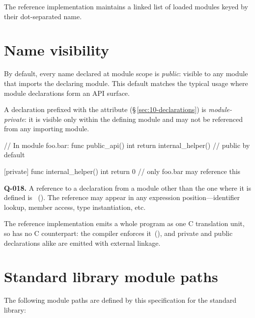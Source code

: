 \begin{note}
  The reference implementation maintains a linked list of loaded modules
  keyed by their dot-separated name.
\end{note}

\section{Name visibility}
\label{sec:mod.visibility}

\pnum
By default, every name declared at module scope is \textit{public}:
visible to any module that imports the declaring module.  This default
matches the typical usage where module declarations form an API surface.

\pnum
A declaration prefixed with the attribute \tok{[private]}
(\S\,\ref{sec:10-declarations}) is \textit{module-private}: it is
visible only within the defining module and may not be referenced from
any importing module.

\begin{laincode}
// In module foo.bar:
func public_api() int { return internal_helper() }   // public by default

[private]
func internal_helper() int { return 0 }   // only foo.bar may reference this
\end{laincode}

\begin{constraint}
  \textbf{Q-018.}
  A reference to a \tok{[private]} declaration from a module other than
  the one where it is defined is \illformed{}~().  The
  reference may appear in any expression position---identifier lookup,
  member access, type instantiation, etc.
\end{constraint}

\begin{note}
  The reference implementation emits a whole program as one C translation unit, so
  \tok{[private]} has no C counterpart: the compiler enforces it~(), and
  private and public declarations alike are emitted with external linkage.
\end{note}

\section{Standard library module paths}
\label{sec:mod.stdlib}

\pnum
The following module paths are defined by this specification for the
standard library:

